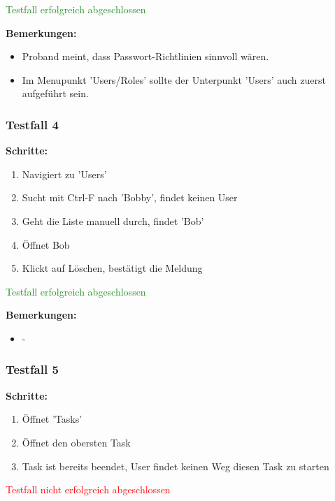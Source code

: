 \textcolor{ForestGreen}{Testfall erfolgreich abgeschlossen}

\bigskip
\textbf{Bemerkungen:}

\begin{itemize}[noitemsep,nolistsep]
    \item Proband meint, dass Passwort-Richtlinien sinnvoll wären.
    \item Im Menupunkt 'Users/Roles' sollte der Unterpunkt 'Users' auch zuerst aufgeführt sein.
\end{itemize}


\subsubsection*{Testfall 4}

\textbf{Schritte:}

\begin{enumerate}
    \item Navigiert zu 'Users'
    \item Sucht mit Ctrl-F nach 'Bobby', findet keinen User
    \item Geht die Liste manuell durch, findet 'Bob'
    \item Öffnet Bob
    \item Klickt auf Löschen, bestätigt die Meldung
\end{enumerate}

\textcolor{ForestGreen}{Testfall erfolgreich abgeschlossen}

\bigskip
\textbf{Bemerkungen:}

\begin{itemize}[noitemsep,nolistsep]
    \item -
\end{itemize}

\subsubsection*{Testfall 5}

\textbf{Schritte:}

\begin{enumerate}
    \item Öffnet 'Tasks'
    \item Öffnet den obersten Task
    \item Task ist bereits beendet, User findet keinen Weg diesen Task zu starten
\end{enumerate}

\textcolor{Red}{Testfall nicht erfolgreich abgeschlossen}


